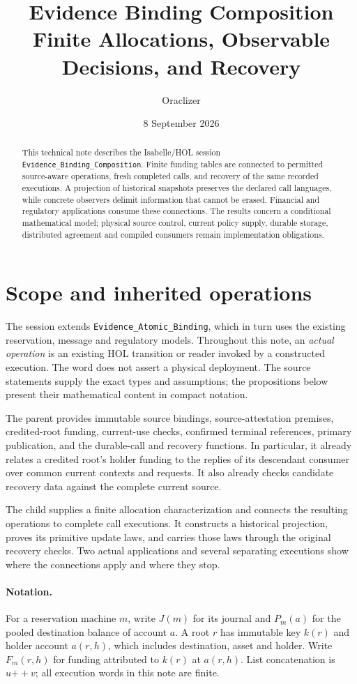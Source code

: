 \documentclass[10pt,a4paper]{article}
\title{Evidence Binding Composition\\[2mm]\large Finite Allocations, Observable Decisions, and Recovery}
\author{Oraclizer}
\date{8 September 2026}
\newcommand{\code}[1]{\nolinkurl{#1}}
\newcommand{\cat}{\mathbin{+\!+}}
\begin{document}
\maketitle
\thispagestyle{plain}
\begin{abstract}
This technical note describes the Isabelle/HOL session
\code{Evidence_Binding_Composition}. Finite funding tables are connected to
permitted source-aware operations, fresh completed calls, and recovery of the
same recorded executions. A projection of historical snapshots preserves the
declared call languages, while concrete observers delimit information that
cannot be erased. Financial and regulatory applications consume these
connections. The results concern a conditional mathematical model; physical
source control, current policy supply, durable storage, distributed agreement
and compiled consumers remain implementation obligations.
\end{abstract}

\section{Scope and inherited operations}
The session extends \code{Evidence_Atomic_Binding}, which in turn uses the
existing reservation, message and regulatory models. Throughout this note,
an \emph{actual operation} is an existing HOL transition or reader invoked
by a constructed execution. The word does not assert a physical deployment.
The source statements supply the exact types and assumptions; the propositions
below present their mathematical content in compact notation.

The parent provides immutable source bindings, source-attestation premises,
credited-root funding, current-use checks, confirmed terminal references,
primary publication, and the durable-call and recovery functions. In
particular, it already relates a credited root's holder funding to the replies
of its descendant consumer over common current contexts and requests. It also
already checks candidate recovery data against the complete current source.

The child supplies a finite allocation characterization and connects the
resulting operations to complete call executions. It constructs a historical
projection, proves its primitive update laws, and carries those laws through
the original recovery checks. Two actual applications and several separating
executions show where the connections apply and where they stop.

\paragraph{Notation.}
For a reservation machine $m$, write $J(m)$ for its journal and $P_m(a)$ for
the pooled destination balance of account $a$. A root $r$ has immutable key
$k(r)$ and holder account $a(r,h)$, which includes destination, asset and holder.
Write $F_m(r,h)$ for funding attributed to $k(r)$ at $a(r,h)$. List
concatenation is $u\cat v$; all execution words in this note are finite.
\end{document}
